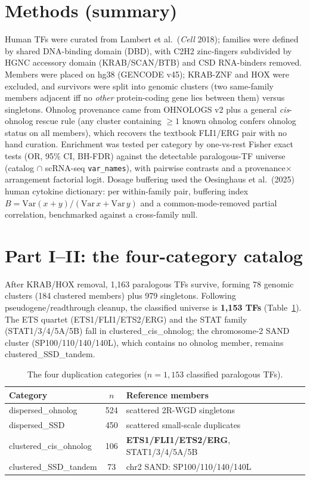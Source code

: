 \documentclass[11pt]{article}
\newcommand{\dispoh}{\textcolor{ohnolog}{dispersed\_ohnolog}}
\newcommand{\clusoh}{\textcolor{ohnolog}{clustered\_cis\_ohnolog}}
\newcommand{\clusssd}{\textcolor{ssd}{clustered\_SSD\_tandem}}
\newcommand{\dispssd}{\textcolor{ssd}{dispersed\_SSD}}
\begin{document}
\section{Methods (summary)}
Human TFs were curated from Lambert et al.\ (\textit{Cell} 2018); families were defined by
shared DNA-binding domain (DBD), with C2H2 zinc-fingers subdivided by HGNC accessory
domain (KRAB/SCAN/BTB) and CSD RNA-binders removed. Members were placed on hg38 (GENCODE
v45); KRAB-ZNF and HOX were excluded, and survivors were split into genomic clusters (two
same-family members adjacent iff no \emph{other} protein-coding gene lies between them)
versus singletons. Ohnolog provenance came from OHNOLOGS v2 plus a general
\emph{cis}-ohnolog rescue rule (any cluster containing $\geq1$ known ohnolog confers
ohnolog status on all members), which recovers the textbook FLI1/ERG pair with no hand
curation. Enrichment was tested per category by one-vs-rest Fisher exact tests (OR, 95\%
CI, BH-FDR) against the detectable paralogous-TF universe (catalog $\cap$ scRNA-seq
\texttt{var\_names}), with pairwise contrasts and a provenance$\times$arrangement
factorial logit. Dosage buffering used the Oesinghaus et al.\ (2025) human cytokine
dictionary: per within-family pair, buffering index $B=\mathrm{Var}(x{+}y)/(\mathrm{Var}\,x+\mathrm{Var}\,y)$
and a common-mode-removed partial correlation, benchmarked against a cross-family null.

\section{Part I--II: the four-category catalog}

After KRAB/HOX removal, 1{,}163 paralogous TFs survive, forming 78 genomic clusters
(184 clustered members) plus 979 singletons. Following pseudogene/readthrough cleanup, the
classified universe is \textbf{1{,}153 TFs} (Table~\ref{tab:counts}). The ETS quartet
(ETS1/FLI1/ETS2/ERG) and the STAT family (STAT1/3/4/5A/5B) fall in \clusoh; the chromosome-2
SAND cluster (SP100/110/140/140L), which contains no ohnolog member, remains \clusssd.

\begin{table}[h]
\centering
\caption{The four duplication categories ($n=1{,}153$ classified paralogous TFs).}
\label{tab:counts}
\begin{tabular}{lcl}
\toprule
\textbf{Category} & \textbf{$n$} & \textbf{Reference members} \\
\midrule
\dispoh   & 524 & scattered 2R-WGD singletons \\
\dispssd  & 450 & scattered small-scale duplicates \\
\clusoh   & 106 & \textbf{ETS1/FLI1/ETS2/ERG}, STAT1/3/4/5A/5B \\
\clusssd  & 73  & chr2 SAND: SP100/110/140/140L \\
\bottomrule
\end{tabular}
\end{table}
\end{document}
